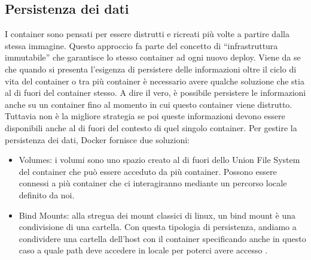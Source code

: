 \subsection{Persistenza dei dati}
I container sono pensati per essere distrutti e ricreati più volte a partire dalla stessa immagine. Questo approccio fa parte del concetto di “infrastruttura immutabile” che garantisce lo stesso container ad ogni nuovo deploy. Viene da se che quando si presenta l’esigenza di persistere delle informazioni oltre il ciclo di vita del container o tra più container è necessario avere qualche soluzione che stia al di fuori del container stesso. A dire il vero, è possibile persistere le informazioni anche su un container fino al momento in cui questo container viene distrutto. Tuttavia non è la migliore strategia se poi queste informazioni devono essere disponibili anche al di fuori del contesto di quel singolo container. Per gestire la persistenza dei dati, Docker fornisce due soluzioni:
\begin{itemize}
    \item Volumes: i volumi sono uno spazio creato al di fuori dello Union File System del container che può essere acceduto da più container. Possono essere connessi a più container che ci interagiranno mediante un percorso locale definito da noi.
    \item Bind Mounts: alla stregua dei mount classici di linux, un bind mount è una condivisione di una cartella.
    Con questa tipologia di persistenza, andiamo a condividere una cartella dell’host con il container specificando anche in questo caso a quale path deve accedere in locale per poterci avere accesso \cite{docker_persistenza}.
    \end{itemize}

